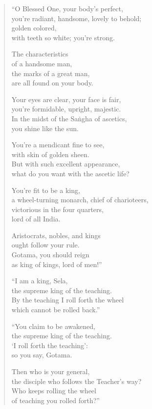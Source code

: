 \documentclass[12pt,openany]{book}%
\begin{document}
\begin{verse}%
“O Blessed One, your body’s perfect, \\
you’re radiant, handsome, lovely to behold; \\
golden colored, \\
with teeth so white; you’re strong. 

The characteristics \\
of a handsome man, \\
the marks of a great man, \\
are all found on your body. 

Your eyes are clear, your face is fair, \\
you’re formidable, upright, majestic. \\
In the midst of the \textsanskrit{Saṅgha} of ascetics, \\
you shine like the sun. 

You’re a mendicant fine to see, \\
with skin of golden sheen. \\
But with such excellent appearance, \\
what do you want with the ascetic life? 

You’re fit to be a king, \\
a wheel-turning monarch, chief of charioteers, \\
victorious in the four quarters, \\
lord of all India. 

Aristocrats, nobles, and kings \\
ought follow your rule. \\
Gotama, you should reign \\
as king of kings, lord of men!” 

“I am a king, Sela, \\
the supreme king of the teaching. \\
By the teaching I roll forth the wheel \\
which cannot be rolled back.” 

“You claim to be awakened, \\
the supreme king of the teaching. \\
‘I roll forth the teaching’: \\
so you say, Gotama. 

Then who is your general, \\
the disciple who follows the Teacher’s way? \\
Who keeps rolling the wheel \\
of teaching you rolled forth?” 


\end{verse}
\end{document}
